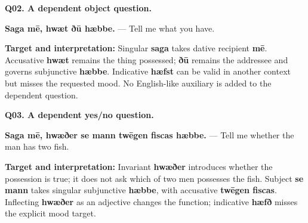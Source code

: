 \par\begin{minipage}{\linewidth}\raggedright
\textbf{Q02. A dependent object question.}

\textbf{Saga mē, hwæt ðū hæbbe.} — Tell me what you have.

\textbf{Target and interpretation:} Singular \textbf{saga} takes dative recipient \textbf{mē}. Accusative \textbf{hwæt} remains the thing possessed; \textbf{ðū} remains the addressee and governs subjunctive \textbf{hæbbe}. Indicative \textbf{hæfst} can be valid in another context but misses the requested mood. No English-like auxiliary is added to the dependent question.

\end{minipage}\par\addvspace{4pt}

\par\begin{minipage}{\linewidth}\raggedright
\textbf{Q03. A dependent yes/\allowbreak{}no question.}

\textbf{Saga mē, hwæðer se mann twēgen fiscas hæbbe.} — Tell me whether the man has two fish.

\textbf{Target and interpretation:} Invariant \textbf{hwæðer} introduces whether the possession is true; it does not ask which of two men possesses the fish. Subject \textbf{se mann} takes singular subjunctive \textbf{hæbbe}, with accusative \textbf{twēgen fiscas}. Inflecting \textbf{hwæðer} as an adjective changes the function; indicative \textbf{hæfð} misses the explicit mood target.

\end{minipage}\par\addvspace{4pt}

